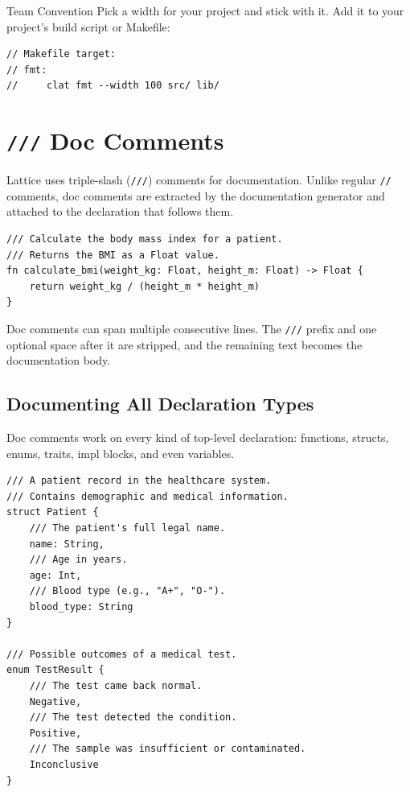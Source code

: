 \begin{tipbox}{Team Convention}
Pick a width for your project and stick with it.
Add it to your project's build script or Makefile:
\begin{lstlisting}[language=Lattice]
// Makefile target:
// fmt:
//     clat fmt --width 100 src/ lib/
\end{lstlisting}
\end{tipbox}

\section{\texttt{///} Doc Comments}\label{sec:doc-comments}

Lattice uses triple-slash (\lstinline|///|) comments for documentation.
Unlike regular \lstinline|//| comments, doc comments are extracted by the documentation generator and attached to the declaration that follows them.

\begin{lstlisting}[language=Lattice, caption={Doc comments on a function}]
/// Calculate the body mass index for a patient.
/// Returns the BMI as a Float value.
fn calculate_bmi(weight_kg: Float, height_m: Float) -> Float {
    return weight_kg / (height_m * height_m)
}
\end{lstlisting}

Doc comments can span multiple consecutive lines.
The \lstinline|///| prefix and one optional space after it are stripped, and the remaining text becomes the documentation body.

\subsection{Documenting All Declaration Types}\label{sec:doc-comments-types}

Doc comments work on every kind of top-level declaration: functions, structs, enums, traits, impl blocks, and even variables.

\begin{lstlisting}[language=Lattice, caption={Doc comments on structs and enums}]
/// A patient record in the healthcare system.
/// Contains demographic and medical information.
struct Patient {
    /// The patient's full legal name.
    name: String,
    /// Age in years.
    age: Int,
    /// Blood type (e.g., "A+", "O-").
    blood_type: String
}

/// Possible outcomes of a medical test.
enum TestResult {
    /// The test came back normal.
    Negative,
    /// The test detected the condition.
    Positive,
    /// The sample was insufficient or contaminated.
    Inconclusive
}
\end{lstlisting}

